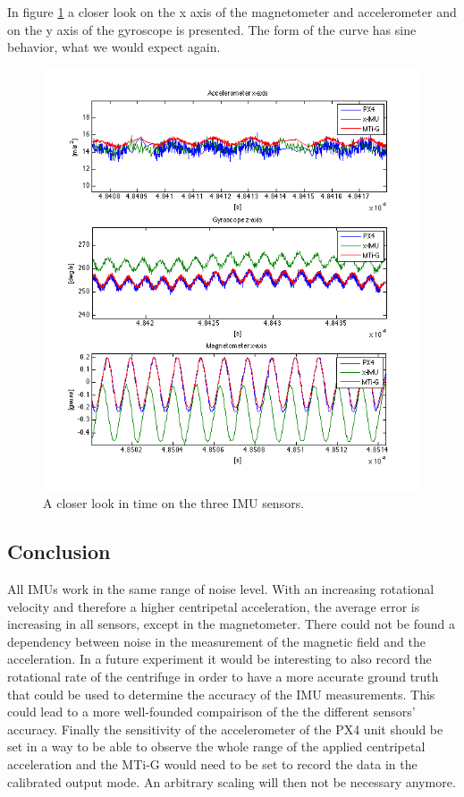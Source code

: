 In figure \ref{ct_sine} a closer look on the x axis of the magnetometer and accelerometer and on the y axis of the gyroscope is presented. The form of the curve has sine behavior, what we would expect again.
\begin{figure}[hb]
\includegraphics[width=1\textwidth]{pictures/ct_sine.png}
\caption{A closer look in time on the three IMU sensors.}
\label{ct_sine}
\end{figure}

\FloatBarrier
\subsection{Conclusion}
All IMUs work in the same range of noise level. With an increasing rotational velocity and therefore a higher centripetal acceleration, the average error is increasing in all sensors, except in the magnetometer. There could not be found a dependency between noise in the measurement of the magnetic field and the acceleration. 
In a future experiment it would be interesting to also record the rotational rate of the centrifuge in order to have a more accurate ground truth that could be used to determine the accuracy of the IMU measurements. This could lead to a more well-founded compairison of the the different sensors' accuracy. Finally the sensitivity of the accelerometer of the PX4 unit should be set in a way to be able to observe the whole range of the applied centripetal acceleration and the MTi-G would need to be set to record the data in the calibrated output mode. An arbitrary scaling will then not be necessary anymore.

